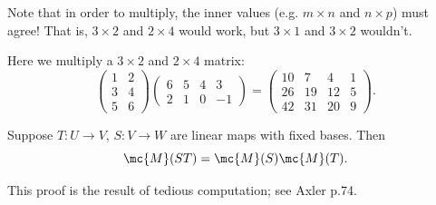\documentclass[math0540-lecture-notes.tex]{subfiles}
\begin{document}
Note that in order to multiply, the inner values (e.g. $m\times n$ and $n\times p$) must agree! That
is, $3\times 2$ and $2\times 4$ would work, but $3\times 1$ and $3\times 2$ wouldn't.
\begin{example}
  Here we multiply a $3\times 2$ and $2\times 4$ matrix: \[
    \begin{pmatrix} 1&2\\3&4\\5&6 \end{pmatrix} \begin{pmatrix} 6&5&4&3 \\2&1&0&-1\end{pmatrix}
    =\begin{pmatrix} 10&7&4&1\\26&19&12&5\\42&31&20&9 \end{pmatrix}
  .\] 
\end{example} 

\begin{proposition}[]{}
  Suppose $T:U\to V$, $S:V\to W$ are linear maps with fixed bases. Then \[
    \mc{M}(ST)=\mc{M}(S)\mc{M}(T)
  .\] 
\end{proposition}
This proof is the result of tedious computation; see Axler p.74.
\end{document}
